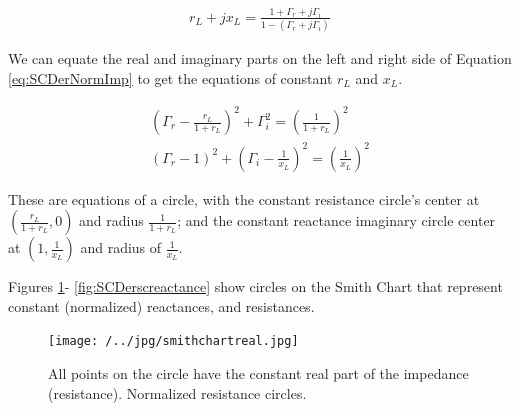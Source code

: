 \documentclass{ximera}
\begin{document}
\begin{eqnarray}
r_L + j x_L = \frac{ 1+\Gamma_r + j \Gamma_i}{1- (\Gamma_r + j \Gamma_i)} \label{eq:SCDerRealImag}
\end{eqnarray}

We can equate the real and imaginary parts on the left and right side of Equation \ref{eq:SCDerNormImp} to get the equations of constant $r_L$ and $x_L$.


\begin{eqnarray}
\left( \Gamma_r - \frac{r_L}{1+r_L}   \right)^2 + \Gamma_i^2  =\left( \frac{1}{1+r_L}   \right) ^2 \label{eq:SCDerRealCirc} \\
\left( \Gamma_r - 1   \right)^2 + \left(\Gamma_i - \frac{1}{x_L}    \right)^2  =\left( \frac{1}{x_L}   \right) ^2 \label{eq:SCDerImagCirc}
\end{eqnarray}

These are equations of a circle, with the constant resistance  circle's center at $(\frac{r_L}{1+r_L} ,0)$ and radius $\frac{1}{1+r_L} $; and the constant reactance imaginary circle center at $(1,\frac{1}{x_L})$ and radius of $ \frac{1}{x_L}  $.

Figures \ref{fig:SCDerscresistance}- \ref{fig:SCDerscreactance}  show circles on the Smith Chart that represent constant (normalized) reactances, and resistances. 
\begin{figure}[htbp]
\begin{center}
\texttt{[image: /../jpg/smithchartreal.jpg]}
\end{center}
\caption{All points on the circle have the constant real part of the impedance (resistance). Normalized resistance circles.}
\label{fig:SCDerscresistance}
\end{figure}
\end{document}
